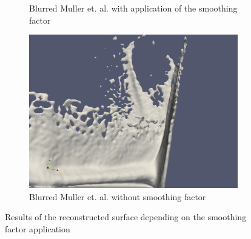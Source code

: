 \begin{figure}[H]
\begin{center}
\begin{subfigure}[b]{0.7\textwidth}
			\caption{Blurred Muller et. al. with application of the smoothing factor}
		\end{subfigure}
		\begin{subfigure}[b]{0.7\textwidth}
			\includegraphics[width=\textwidth]{figures/BlurSmoothingFactorNonepng.png}
			\caption{Blurred Muller et. al. without smoothing factor}
		\end{subfigure}

	\end{center}
	\caption{Results of the reconstructed surface depending on the smoothing factor application}
	\label{fig:smoothing_factor_influence}
\end{figure}


